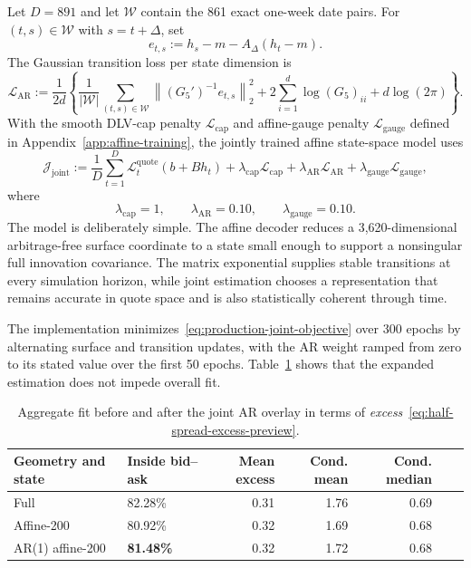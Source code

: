 \documentclass[11pt,a4paper]{article}
\DeclareRobustCommand{\eqlabel}[1]{\label{eq:#1}}                                     %
\DeclareRobustCommand{\eq}[1]{\begin{equation}\eqlabel{#1}}                           %
\DeclareRobustCommand{\eqend}{\end{equation}}                                         %
\begin{document}
Let $D=891$ and let $\mathcal W$ contain the 861 exact one-week date pairs.
For $(t,s)\in\mathcal W$ with $s=t+\Delta$, set
\eq{oneweekresidual}
  e_{t,s}:=h_s-m-A_\Delta(h_t-m).
\eqend
The Gaussian transition loss per state dimension is
\begin{equation}
  \mathcal L_{\mathrm{AR}}
  :=\frac{1}{2d}\left\{
      \frac{1}{\lvert\mathcal W\rvert}
        \sum_{(t,s)\in\mathcal W}
          \left\|(G_5')^{-1}e_{t,s}\right\|_2^2
      +2\sum_{i=1}^{d}\log (G_5)_{ii}+d\log(2\pi)
    \right\}.
  \label{eq:production-ar-loss}
\end{equation}
With the smooth DLV-cap penalty $\mathcal L_{\mathrm{cap}}$ and affine-gauge
penalty $\mathcal L_{\mathrm{gauge}}$ defined in
Appendix~\ref{app:affine-training}, the jointly trained affine state-space
model uses
\begin{equation}
  \mathcal J_{\mathrm{joint}}
  :=\frac1D\sum_{t=1}^{D}
       \mathcal L_t^{\mathrm{quote}}(b+B h_t)
     +\lambda_{\mathrm{cap}}\mathcal L_{\mathrm{cap}}
     +\lambda_{\mathrm{AR}}\mathcal L_{\mathrm{AR}}
     +\lambda_{\mathrm{gauge}}\mathcal L_{\mathrm{gauge}},
  \label{eq:production-joint-objective}
\end{equation}
where
\[
  \lambda_{\mathrm{cap}}=1,
  \qquad \lambda_{\mathrm{AR}}=0.10,
  \qquad \lambda_{\mathrm{gauge}}=0.10.
\]
The model is deliberately simple.  The affine decoder reduces a
3,620-dimensional arbitrage-free surface coordinate to a state small
enough to support a nonsingular full innovation covariance.  The
matrix exponential supplies stable transitions at every simulation horizon,
while joint estimation chooses a representation that remains accurate in
quote space and is also statistically coherent through time.

The implementation minimizes~\eqref{eq:production-joint-objective} over 300
epochs by alternating surface and transition updates, with the AR weight
ramped from zero to its stated value over the first 50 epochs. Table~\ref{tab:aggregate-fit2}
shows that the expanded estimation does not impede overall fit.

\begin{table}[H]
\centering
\begin{tabular}{llrrrrr}
\toprule
Geometry and state & Inside bid--ask
  & Mean excess & Cond. mean & Cond. median\\
\midrule
Full & 82.28\% & 0.31 & 1.76 & 0.69\\
Affine-200 & 80.92\% & 0.32 & 1.69 & 0.68\\
AR(1) affine-200 &\textbf{81.48\%} & 0.32 & 1.72 & 0.68\\
\bottomrule
\end{tabular}
\caption{Aggregate fit before and after the joint AR overlay in terms of \emph{excess}~\eqref{eq:half-spread-excess-preview}.}
\label{tab:aggregate-fit2}
\end{table}
\end{document}
